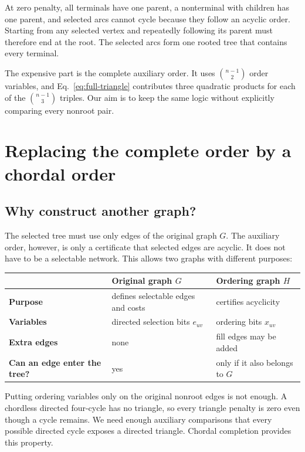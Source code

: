 \documentclass[10pt,a4paper]{article}
\begin{document}
At zero penalty, all terminals have one parent, a nonterminal with children
has one parent, and selected arcs cannot cycle because they follow an acyclic
order. Starting from any selected vertex and repeatedly following its parent
must therefore end at the root. The selected arcs form one rooted tree that
contains every terminal.

The expensive part is the complete auxiliary order. It uses
$\binom{n-1}{2}$ order variables, and Eq.~\eqref{eq:full-triangle} contributes
three quadratic products for each of the $\binom{n-1}{3}$ triples. Our aim is
to keep the same logic without explicitly comparing every nonroot pair.

\section{Replacing the complete order by a chordal order}

\subsection{Why construct another graph?}

The selected tree must use only edges of the original graph $G$. The auxiliary
order, however, is only a certificate that selected edges are acyclic. It does
not have to be a selectable network. This allows two graphs with different
purposes:

\begin{center}
\begin{tabularx}{0.95\linewidth}{>{\bfseries}l
  >{\raggedright\arraybackslash}X
  >{\raggedright\arraybackslash}X}
\toprule
 & Original graph $G$ & Ordering graph $H$ \\
\midrule
Purpose & defines selectable edges and costs & certifies acyclicity \\
Variables & directed selection bits $e_{uv}$ & ordering bits $x_{uv}$ \\
Extra edges & none & fill edges may be added \\
Can an edge enter the tree? & yes & only if it also belongs to $G$ \\
\bottomrule
\end{tabularx}
\end{center}

Putting ordering variables only on the original nonroot edges is not enough.
A chordless directed four-cycle has no triangle, so every triangle penalty is
zero even though a cycle remains. We need enough auxiliary comparisons that
every possible directed cycle exposes a directed triangle. Chordal completion
provides this property.
\end{document}
